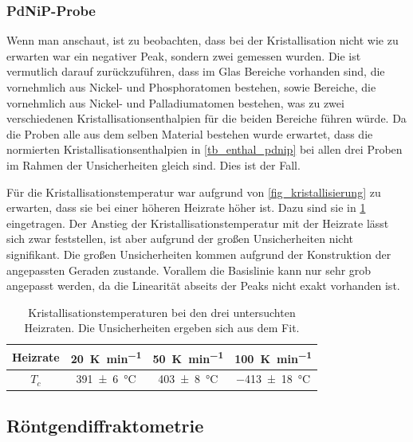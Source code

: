 \documentclass[
	a4paper,
	12pt,
	pagesize,
	ngerman
]{scrartcl}
\begin{document}
	\subsubsection*{PdNiP-Probe}
	Wenn man  anschaut, ist zu beobachten, dass bei der Kristallisation nicht wie zu erwarten war ein negativer Peak, sondern zwei gemessen wurden.
	Die ist vermutlich darauf zurückzuführen, dass im Glas Bereiche vorhanden sind, die vornehmlich aus Nickel- und Phosphoratomen bestehen, sowie Bereiche, die vornehmlich aus Nickel- und Palladiumatomen bestehen, was zu zwei verschiedenen Kristallisationsenthalpien für die beiden Bereiche führen würde.
	Da die Proben alle aus dem selben Material bestehen wurde erwartet, dass die normierten Kristallisationsenthalpien in \cref{tb_enthal_pdnip} bei allen drei Proben im Rahmen der Unsicherheiten gleich sind. %
	Dies ist der Fall.

	Für die Kristallisationstemperatur war aufgrund von \cref{fig_kristallisierung} zu erwarten, dass sie bei einer höheren Heizrate höher ist.
	Dazu sind sie in \cref{tb_kristall_temp} eingetragen.
	Der Anstieg der Kristallisationstemperatur mit der Heizrate lässt sich zwar feststellen, ist aber aufgrund der großen Unsicherheiten nicht signifikant.
	Die großen Unsicherheiten kommen aufgrund der Konstruktion der angepassten Geraden zustande.
	Vorallem die Basislinie kann nur sehr grob angepasst werden, da die Linearität abseits der Peaks nicht exakt vorhanden ist. %

	\begin{table}[H]
			\centering
			\begin{tabular}{c | c | c | c  }
				 Heizrate & \SI{20}{\kelvin \per \minute} & \SI{50}{\kelvin \per \minute}  & \SI{100}{\kelvin \per \minute} \\ \hline
				 $T_c$ & \SI{391 \pm 6}{\celsius}&\SI{403 \pm 8}{\celsius} & \SI{-413 \pm 18}{\celsius}
			\end{tabular}
			\caption{
			Kristallisationstemperaturen bei den drei untersuchten Heizraten. Die Unsicherheiten ergeben sich aus dem Fit.
			}
			\label{tb_kristall_temp}
	\end{table}

	\subsection{Röntgendiffraktometrie}
\end{document}
